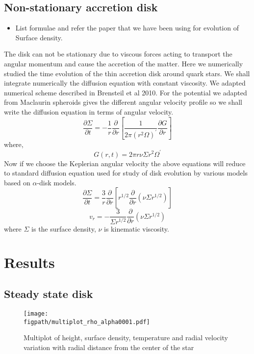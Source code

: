 \documentclass[useAMS,usenatbib]{mn2e}
\newcommand{\figpath}{./Figs/}
\begin{document}
\subsection{Non-stationary accretion disk}
\begin{itemize}
\item List formulae and refer the paper that we have been using for
  evolution of Surface density. 
\end{itemize}
The disk can not be stationary due to viscous forces acting to transport the angular momentum and cause the accretion of the matter. Here we numerically studied the time evolution of the thin accretion disk around quark stars. We shall integrate numerically the diffusion equation with constant viscosity. We adapted numerical scheme described in Brensteil et al 2010. For the potential we adapted from Maclaurin spheroids gives the different angular velocity profile so we shall write the diffusion equation in terms of angular velocity.
\begin{equation}
\frac{\partial\Sigma}{\partial t} = -\frac{1}{r}\frac{\partial}{\partial r}\left[\frac{1}{2\pi(r^2\Omega)^\prime}\frac{\partial G}{\partial r}\right]
\end{equation}
where,
\begin{equation}
G(r,t) = 2\pi r\nu\Sigma r^2 \Omega^\prime 
\end{equation}
Now if we choose the Keplerian angular velocity the above equations will reduce to standard diffusion equation used for study of disk evolution by various models based on $\alpha$-disk models.
\begin{equation}
\frac{\partial\Sigma}{\partial t} = \frac{3}{r}\frac{\partial}{\partial r}\left[r^{1/2}\frac{\partial}{\partial r}\left(\nu\Sigma r^{1/2}\right)\right]
\end{equation}
\begin{equation}
v_r = -\frac{3}{\Sigma r^{1/2}}\frac{\partial}{\partial r}\left(\nu\Sigma r^{1/2}\right)
\end{equation}
where $\Sigma$ is the surface density, $\nu$ is kinematic viscosity.

\section{Results}
\subsection{Steady state disk}
\begin{figure}
\centering
\texttt{[image: \\figpath/multiplot\_rho\_alpha0001.pdf]}
\caption{Multiplot of height, surface density, temperature and radial velocity variation with radial distance from the center of the star }
\label{fig:steadyplt1}
\end{figure}
\end{document}
